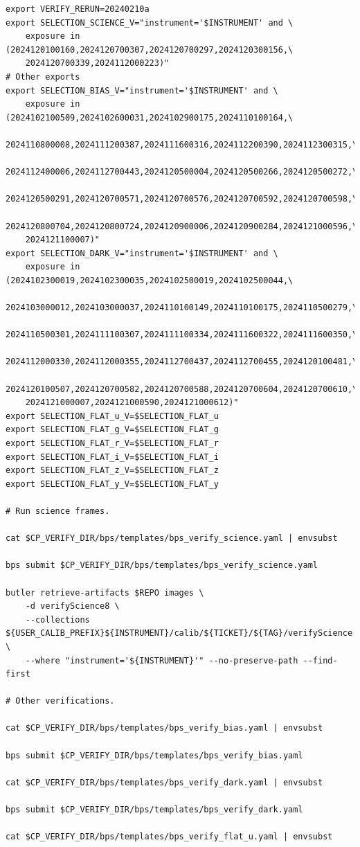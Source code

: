 \documentclass[DM,authoryear,toc]{lsstdoc}
\begin{document}
\begin{verbatim}
export VERIFY_RERUN=20240210a
export SELECTION_SCIENCE_V="instrument='$INSTRUMENT' and \
    exposure in (2024120100160,2024120700307,2024120700297,2024120300156,\
    2024120700339,2024112000223)"
# Other exports
export SELECTION_BIAS_V="instrument='$INSTRUMENT' and \
    exposure in (2024102100509,2024102600031,2024102900175,2024110100164,\
    2024110800008,2024111200387,2024111600316,2024112200390,2024112300315,\
    2024112400006,2024112700443,2024120500004,2024120500266,2024120500272,\
    2024120500291,2024120700571,2024120700576,2024120700592,2024120700598,\
    2024120800704,2024120800724,2024120900006,2024120900284,2024121000596,\
    2024121100007)"
export SELECTION_DARK_V="instrument='$INSTRUMENT' and \
    exposure in (2024102300019,2024102300035,2024102500019,2024102500044,\
    2024103000012,2024103000037,2024110100149,2024110100175,2024110500279,\
    2024110500301,2024111100307,2024111100334,2024111600322,2024111600350,\
    2024112000330,2024112000355,2024112700437,2024112700455,2024120100481,\
    2024120100507,2024120700582,2024120700588,2024120700604,2024120700610,\
    2024121000007,2024121000590,2024121000612)"
export SELECTION_FLAT_u_V=$SELECTION_FLAT_u
export SELECTION_FLAT_g_V=$SELECTION_FLAT_g
export SELECTION_FLAT_r_V=$SELECTION_FLAT_r
export SELECTION_FLAT_i_V=$SELECTION_FLAT_i
export SELECTION_FLAT_z_V=$SELECTION_FLAT_z
export SELECTION_FLAT_y_V=$SELECTION_FLAT_y

# Run science frames.

cat $CP_VERIFY_DIR/bps/templates/bps_verify_science.yaml | envsubst

bps submit $CP_VERIFY_DIR/bps/templates/bps_verify_science.yaml

butler retrieve-artifacts $REPO images \
    -d verifyScience8 \
    --collections ${USER_CALIB_PREFIX}${INSTRUMENT}/calib/${TICKET}/${TAG}/verifyScience.${VERIFY_RERUN} \
    --where "instrument='${INSTRUMENT}'" --no-preserve-path --find-first

# Other verifications.

cat $CP_VERIFY_DIR/bps/templates/bps_verify_bias.yaml | envsubst

bps submit $CP_VERIFY_DIR/bps/templates/bps_verify_bias.yaml

cat $CP_VERIFY_DIR/bps/templates/bps_verify_dark.yaml | envsubst

bps submit $CP_VERIFY_DIR/bps/templates/bps_verify_dark.yaml

cat $CP_VERIFY_DIR/bps/templates/bps_verify_flat_u.yaml | envsubst


\end{verbatim}
\end{document}
